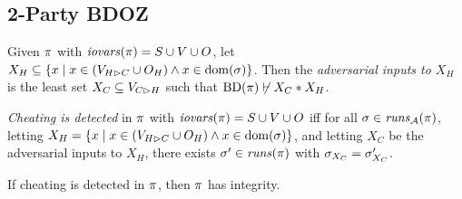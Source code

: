 \subsection{2-Party BDOZ}




\begin{definition}
  Given $\pi$ with $\mathit{iovars}(\pi) = S \cup V \cup O$,
  let $X_H \subseteq \{ x \mid x \in (V_{H \rhd C} \cup O_H) \wedge x \in \mathrm{dom}(\sigma) \}$.
  Then the \emph{adversarial inputs to $X_H$} is the least set
  $X_C \subseteq V_{C \rhd H}$ such that $\mathrm{BD}(\pi) \not\vdash X_C * X_H$.
\end{definition}
\begin{definition}
  \emph{Cheating is detected} in $\pi$ with $\mathit{iovars}(\pi) = S \cup V \cup O$ iff
  for all  $\sigma \in \mathit{runs}_{\mathcal{A}}(\pi)$,
  letting $X_H = \{ x \mid x \in (V_{H \rhd C} \cup O_H) \wedge x \in \mathrm{dom}(\sigma) \}$,
  and letting $X_C$ be the adversarial inputs to $X_H$,
  there exists $\sigma'\in \mathit{runs}(\pi)$
  with $\sigma_{X_C} = \sigma'_{X_C}$.  
\end{definition}

\begin{lemma}
  If cheating is detected in $\pi$, then $\pi$ has integrity.
\end{lemma}
